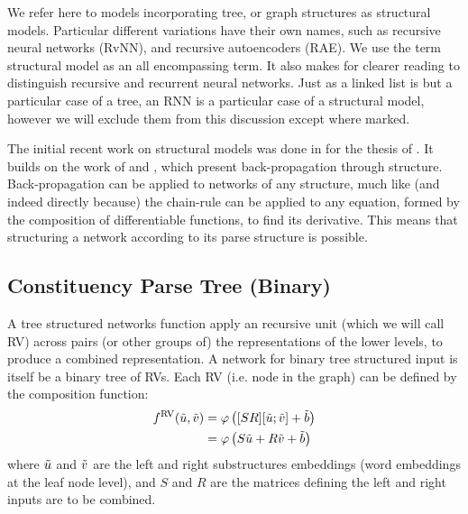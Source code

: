 \documentclass[12pt,parskip]{komatufte}
\begin{document}


We refer here to models incorporating tree, or graph structures as structural models.
Particular different variations have their own names, such as recursive neural networks (RvNN), and recursive autoencoders (RAE).
We use the term structural model as an all encompassing term. 
It also makes for clearer reading to distinguish recursive and recurrent  neural networks.
Just as a linked list is but a particular case of a tree, an RNN is a particular case of a structural model,
however we will exclude them from this discussion except where marked.


The initial recent work on structural models was done in for the thesis of .
It builds on the work of  and , which present back-propagation through structure.
Back-propagation can be applied to networks of any structure, much like (and indeed directly because) the chain-rule can be applied to any equation, formed by the composition of differentiable functions, to find its derivative.
This means that structuring a network according to its parse structure is possible.

\subsection{Constituency Parse Tree (Binary)}
A tree structured networks function apply an recursive unit (which we will call RV) across pairs (or other groups of) the representations of the lower levels, to produce a combined representation.
A network for binary tree structured input is itself be a binary tree of RVs.
Each RV (i.e. node in the graph) can be defined by the composition function:
\begin{align}
	\d f_{RV}(\v u, \v v) &= \varphi\left( [S R][\v u;\v v] + \v b \right) \\ \label{equ:rnn1}
			     &= \varphi\left( S\v u +R\v v + \v b \right)
\end{align}
where $\tilde{u}$ and $\tilde{v}$ are the left and right substructures embeddings (word embeddings at the leaf node level), and $S$ and $R$ are the matrices defining the left and right inputs are to be combined.
\end{document}
